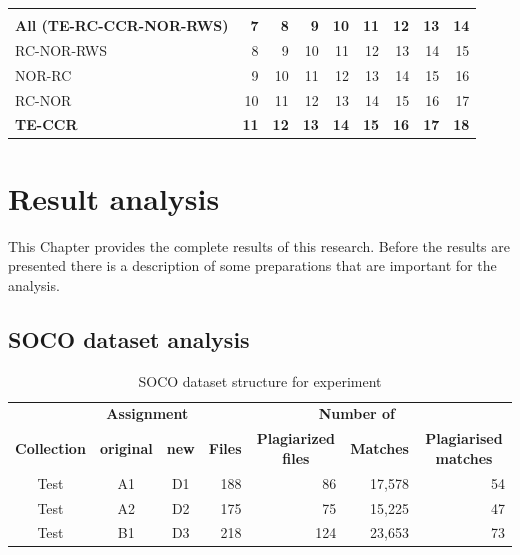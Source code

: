 \documentclass[a4paper, 12pt, oneside, openany, final, pdftex]{book}\usepackage[]{graphicx}\usepackage[]{color}
\begin{document}
\begin{table}
\begin{tabular}{lrrrr|>{}rrrr}
\rowcolor{gray!6}  \addlinespace[0.3em]
\multicolumn{9}{l}{\textbf{Combinations}}\\
\textbf{\hspace{1em}All (TE-RC-CCR-NOR-RWS)} & \textbf{7} & \textbf{8} & \textbf{9} & \textbf{10} & \textbf{11} & \textbf{12} & \textbf{13} & \textbf{14}\\
\hspace{1em}RC-NOR-RWS & 8 & 9 & 10 & 11 & 12 & 13 & 14 & 15\\
\rowcolor{gray!6}  \hspace{1em}NOR-RC & 9 & 10 & 11 & 12 & 13 & 14 & 15 & 16\\
\hspace{1em}RC-NOR & 10 & 11 & 12 & 13 & 14 & 15 & 16 & 17\\
\rowcolor{gray!6}  \textbf{\hspace{1em}TE-CCR} & \textbf{11} & \textbf{12} & \textbf{13} & \textbf{14} & \textbf{15} & \textbf{16} & \textbf{17} & \textbf{18}\\
\bottomrule
\end{tabular}


\end{table}

\chapter{Result analysis}\label{ch:analysis}

    

This Chapter provides the complete results of this research. Before the results are presented there is a description of some preparations that are important for the analysis.

\section{SOCO dataset analysis}

\begin{table} [bt]
	\centering
	\caption{SOCO dataset structure for experiment} \label{tbl:socoSubsetStructure}
	\begin{tabular}{c | c c | r r r r} 
		\toprule
		&  \multicolumn{2}{c}{\textbf{Assignment}} & \multicolumn{4}{c}{\textbf{Number of}} \\
		\cmidrule(l{3pt}r{3pt}){2-3} \cmidrule(l{3pt}r{3pt}){4-7}
		\textbf{Collection} & \textbf{original} & \textbf{new} & \multicolumn{1}{c}{\textbf{Files}} & \multicolumn{1}{c}{\textbf{Plagiarized files}} & \multicolumn{1}{c}{\textbf{Matches}} & \multicolumn{1}{c}{\textbf{Plagiarised matches}} \\ 
		\midrule 
		 	Test & A1 & D1 & 188 &  86 & 17,578&  54  \\
		 	Test & A2 & D2 & 175 &  75 & 15,225&  47  \\
		 	Test & B1 & D3 & 218 & 124 & 23,653&  73  \\
		\bottomrule
	\end{tabular}
\end{table}
\end{document}
